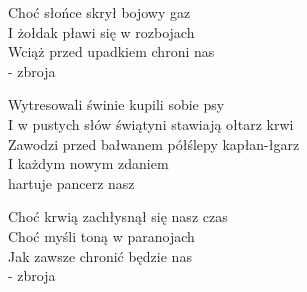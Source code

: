 \begin{text}
    \vin Choć słońce skrył bojowy gaz\\
    \vin I żołdak pławi się w rozbojach\\
    \vin Wciąż przed upadkiem chroni nas\\
	\vin - zbroja

    Wytresowali świnie kupili sobie psy\\
    I w pustych słów świątyni stawiają ołtarz krwi\\
    Zawodzi przed bałwanem półślepy kapłan-łgarz\\
    I każdym nowym zdaniem\\
	hartuje pancerz nasz

    \vin Choć krwią zachłysnął się nasz czas\\
    \vin Choć myśli toną w paranojach\\
    \vin Jak zawsze chronić będzie nas\\
	\vin - zbroja

\end{text}
